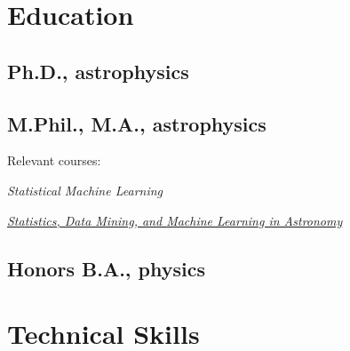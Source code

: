 \documentclass[letterpaper,12pt]{deedy-resume}
\begin{document}
\begin{minipage}[t]{0.32\textwidth} %


\section{Education}

\subsection{Ph.D., astrophysics}

\sectionspace %

\subsection{M.Phil., M.A., astrophysics}
\begin{tighteritemize}
    \item Relevant courses:
    \item \textit{Statistical Machine Learning}
    \item \textit{\href{https://github.com/adrn/NYCastroML}{Statistics, Data Mining, and Machine Learning in Astronomy}}
\end{tighteritemize}

\sectionspace %

\subsection{Honors B.A., physics}

\sectionspace %


\section{Technical Skills}


\end{minipage}
\end{document}
